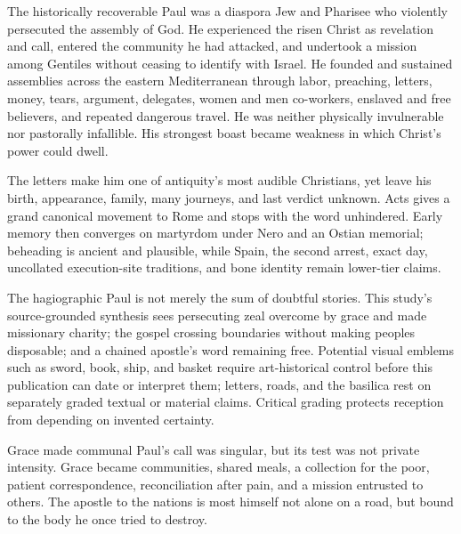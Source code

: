 The historically recoverable Paul was a diaspora Jew and Pharisee who
violently persecuted the assembly of God. He experienced the risen Christ as
revelation and call, entered the community he had attacked, and undertook a
mission among Gentiles without ceasing to identify with Israel. He founded and
sustained assemblies across the eastern Mediterranean through labor,
preaching, letters, money, tears, argument, delegates, women and men
co-workers, enslaved and free believers, and repeated dangerous travel. He was
neither physically invulnerable nor pastorally infallible. His strongest
boast became weakness in which Christ's power could dwell.

The letters make him one of antiquity's most audible Christians, yet leave his
birth, appearance, family, many journeys, and last verdict unknown. Acts gives
a grand canonical movement to Rome and stops with the word unhindered. Early
memory then converges on martyrdom under Nero and an Ostian memorial; beheading
is ancient and plausible, while Spain, the second arrest, exact day,
uncollated execution-site traditions, and bone identity remain lower-tier
claims.

The hagiographic Paul is not merely the sum of doubtful stories. This study's
source-grounded synthesis sees persecuting zeal overcome by grace and made
missionary charity; the gospel crossing boundaries without making peoples
disposable; and a chained apostle's word remaining free. Potential
visual emblems such as sword, book, ship, and basket require art-historical
control before this publication can date or interpret them; letters, roads,
and the basilica rest on separately graded textual or material claims.
Critical grading protects reception from depending on invented certainty.

\begin{studybox}{Grace made communal}
Paul's call was singular, but its test was not private intensity. Grace became
communities, shared meals, a collection for the poor, patient correspondence,
reconciliation after pain, and a mission entrusted to others. The apostle to
the nations is most himself not alone on a road, but bound to the body he once
tried to destroy.
\end{studybox}
